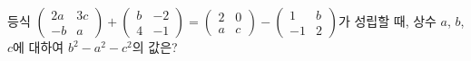 등식 $\begin{pmatrix} 2a & 3c \\ -b & a \end{pmatrix}+\begin{pmatrix} b & -2 \\ 4 & -1 \end{pmatrix}=\begin{pmatrix} 2 & 0 \\ a & c \end{pmatrix}-\begin{pmatrix} 1 & b \\ -1 & 2 \end{pmatrix}$가 성립할 때, 상수 $a$, $b$, $c$에 대하여 $b^2-a^2-c^2$의 값은?
